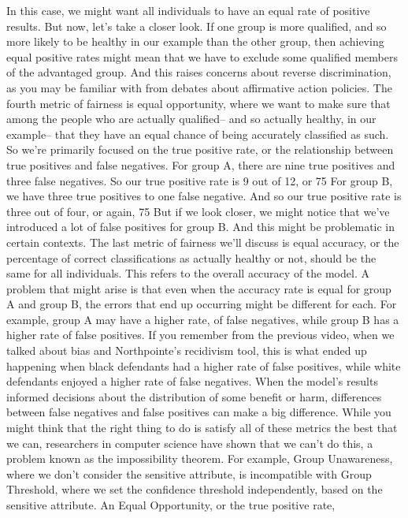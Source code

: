 In this case, we might want all individuals to have
an equal rate of positive results.
But now, let's take a closer look.
If one group is more qualified, and so more
likely to be healthy in our example than the other group,
then achieving equal positive rates might
mean that we have to exclude some qualified members
of the advantaged group.
And this raises concerns about reverse discrimination,
as you may be familiar with from debates about affirmative action policies.
The fourth metric of fairness is equal opportunity,
where we want to make sure that among the people who are actually qualified--
and so actually healthy, in our example--
that they have an equal chance of being accurately classified as such.
So we're primarily focused on the true positive rate,
or the relationship between true positives and false negatives.
For group A, there are nine true positives and three false negatives.
So our true positive rate is 9 out of 12, or 75%
For group B, we have three true positives to one false negative.
And so our true positive rate is three out of four, or again, 75%
But if we look closer, we might notice that we've
introduced a lot of false positives for group B.
And this might be problematic in certain contexts.
The last metric of fairness we'll discuss
is equal accuracy, or the percentage of correct classifications as actually
healthy or not, should be the same for all individuals.
This refers to the overall accuracy of the model.
A problem that might arise is that even when
the accuracy rate is equal for group A and group B,
the errors that end up occurring might be different for each.
For example, group A may have a higher rate,
of false negatives, while group B has a higher rate of false positives.
If you remember from the previous video, when
we talked about bias and Northpointe's recidivism tool,
this is what ended up happening when black defendants had a higher
rate of false positives, while white defendants enjoyed
a higher rate of false negatives.
When the model's results informed decisions
about the distribution of some benefit or harm,
differences between false negatives and false positives
can make a big difference.
While you might think that the right thing to do
is satisfy all of these metrics the best that we can,
researchers in computer science have shown
that we can't do this, a problem known as the impossibility theorem.
For example, Group Unawareness, where we don't consider the sensitive attribute,
is incompatible with Group Threshold, where
we set the confidence threshold independently,
based on the sensitive attribute.
An Equal Opportunity, or the true positive rate,
